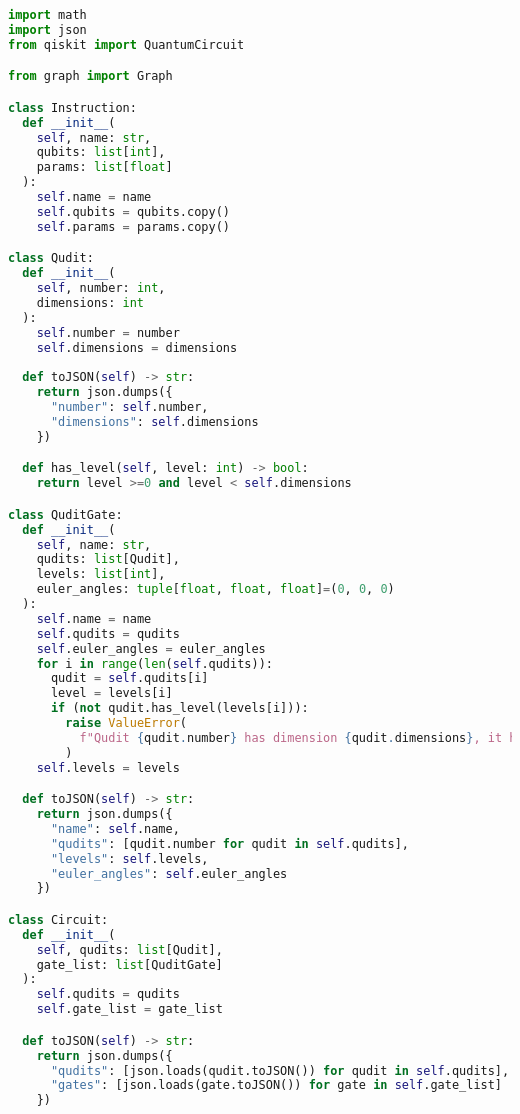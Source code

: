   \begin{lstlisting}[language=Python,caption=\texttt{circuit.py},label=lst:circuit.py]
import math
import json
from qiskit import QuantumCircuit

from graph import Graph

class Instruction:
  def __init__(
    self, name: str,
    qubits: list[int],
    params: list[float]
  ):
    self.name = name
    self.qubits = qubits.copy()
    self.params = params.copy()

class Qudit:
  def __init__(
    self, number: int,
    dimensions: int
  ):
    self.number = number
    self.dimensions = dimensions
  
  def toJSON(self) -> str:
    return json.dumps({
      "number": self.number,
      "dimensions": self.dimensions
    })

  def has_level(self, level: int) -> bool:
    return level >=0 and level < self.dimensions

class QuditGate:
  def __init__(
    self, name: str,
    qudits: list[Qudit],
    levels: list[int],
    euler_angles: tuple[float, float, float]=(0, 0, 0)
  ):
    self.name = name
    self.qudits = qudits
    self.euler_angles = euler_angles
    for i in range(len(self.qudits)):
      qudit = self.qudits[i]
      level = levels[i]
      if (not qudit.has_level(levels[i])):
        raise ValueError(
          f"Qudit {qudit.number} has dimension {qudit.dimensions}, it has no level {level}"
        )
    self.levels = levels

  def toJSON(self) -> str:
    return json.dumps({
      "name": self.name,
      "qudits": [qudit.number for qudit in self.qudits],
      "levels": self.levels,
      "euler_angles": self.euler_angles
    })

class Circuit:
  def __init__(
    self, qudits: list[Qudit],
    gate_list: list[QuditGate]
  ):
    self.qudits = qudits
    self.gate_list = gate_list

  def toJSON(self) -> str:
    return json.dumps({
      "qudits": [json.loads(qudit.toJSON()) for qudit in self.qudits],
      "gates": [json.loads(gate.toJSON()) for gate in self.gate_list]
    })
  

\end{lstlisting}
